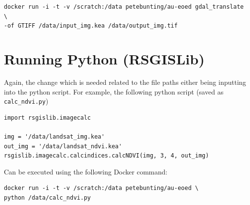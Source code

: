 \documentclass[authoryear, 11pt, oneside]{report}
\begin{document}
\begin{verbatim}
docker run -i -t -v /scratch:/data petebunting/au-eoed gdal_translate \
-of GTIFF /data/input_img.kea /data/output_img.tif
\end{verbatim}

\section{Running Python (RSGISLib)}

Again, the change which is needed related to the file paths either being inputting into the python script. For example, the following python script (saved as \texttt{calc_ndvi.py})

\begin{verbatim}
import rsgislib.imagecalc

img = '/data/landsat_img.kea'
out_img = '/data/landsat_ndvi.kea'
rsgislib.imagecalc.calcindices.calcNDVI(img, 3, 4, out_img)

\end{verbatim}

Can be executed using the following Docker command:

\begin{verbatim}
docker run -i -t -v /scratch:/data petebunting/au-eoed \
python /data/calc_ndvi.py
\end{verbatim}
\end{document}
